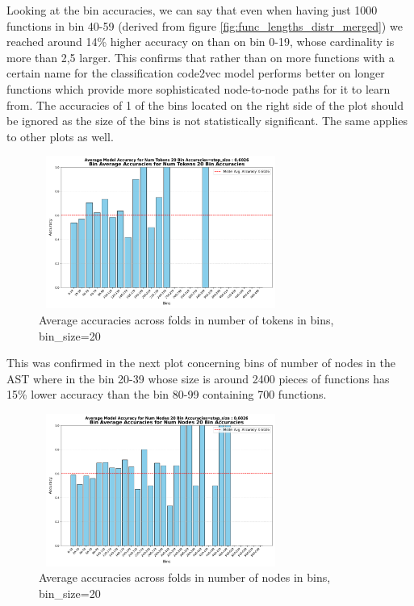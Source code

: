 \documentclass[10pt,english,a4paper]{report}
\begin{document}
Looking at the bin accuracies, we can say that even when having just 1000 functions in 
bin 40-59 (derived from figure \ref{fig:func_lengths_distr_merged}) we reached around 14\% 
higher accuracy on than on bin 0-19, whose cardinality is more than 2,5 larger.
This confirms that rather than on more functions with a certain name for the classification
code2vec model performs better on longer functions which provide more sophisticated 
node-to-node paths for it to learn from. The accuracies of 1 of the bins located on the right side of 
the plot should be ignored as the size of the bins is not statistically significant. The same 
applies to other plots as well.

\begin{figure}[H]
    \centering
    \includegraphics[width=8cm, height=5cm]{figures/testing/bins/num_tokens_20_bin_accuracies.pdf}
    \caption{Average accuracies across folds in number of tokens in bins, bin\_size=20}
    \label{fig:bins_tokens}
\end{figure}

This was confirmed in the next plot concerning bins of number of nodes in the AST where in the bin 20-39 whose size is 
around 2400 pieces of functions has 15\% lower accuracy than the bin 80-99 containing 700 functions.

\begin{figure}[H]
    \centering
    \includegraphics[width=8cm, height=5cm]{figures/testing/bins/num_nodes_20_bin_accuracies.pdf}
    \caption{Average accuracies across folds in number of nodes in bins, bin\_size=20}
    \label{fig:bins_nodes}
\end{figure}
\end{document}
